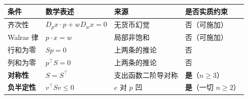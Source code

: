\begin{center}
\begin{tabular}{llll}
\toprule
条件 & 数学表述 & 来源 & 是否实质约束\\
\midrule
齐次性 & $D_px\cdot p+wD_wx=0$ & 无货币幻觉 & 否（可施加）\\
Walras 律 & $p\cdot x=w$ & 局部非饱和 & 否（可施加）\\
行和为零 & $Sp=0$ & 上两条的推论 & 否\\
列和为零 & $p^{\top}S=0$ & 上两条的推论 & 否\\
\textbf{对称性} & $S=S^{\top}$ & 支出函数二阶导对称 & \textbf{是}（$n\ge3$）\\
\textbf{负半定性} & $v^{\top}Sv\le0$ & $e$ 对 $p$ 凹 & \textbf{是}（一切 $n\ge2$）\\
\bottomrule
\end{tabular}
\end{center}
